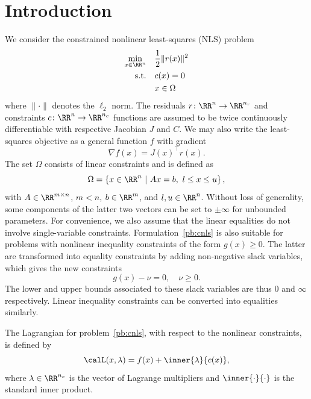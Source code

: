 \section{Introduction}

We consider the constrained nonlinear least-squares (NLS) problem
\begin{equation}
	\label{pb:cnls}
	\begin{aligned}
		\min_{x\in \RR^n} \quad & \dfrac{1}{2} \|r(x)\|^2 \\
		\text{s.t.} \quad & c(x) = 0 \\
		& x \in \Omega
	\end{aligned}
\end{equation}
where $\|\cdot\|$ denotes the $\ell_2$ norm. The residuals $r\colon \RR^n \to \RR^{n_r}$ and constraints $c\colon \RR^n \to \RR^{n_c}$ functions are assumed to be twice continuously differentiable with respective Jacobian $J$ and $C$. We may also write the least-squares objective as a general function $f$ with gradient 
\[\nabla f(x) = J(x)^\top r(x).\] 
The set $\Omega$ consists of linear constraints and is defined as
\begin{equation}\label{eq:linear_constraints}
	\Omega = \left\{ x \in \RR^n \ | \ Ax=b,\ l \le x \le u\right\},
\end{equation}
with $A\in\RR^{m\times n}$, $m < n$, $b\in \RR^m$, and $l,u \in \RR^n$. Without loss of generality, some components of the latter two vectors can be set to $\pm \infty$ for unbounded parameters. For convenience, we also assume that the linear equalities do not involve single-variable constraints. Formulation~\eqref{pb:cnls} is also suitable for problems with nonlinear inequality constraints of the form $g(x) \ge 0$. The latter are transformed into equality constraints by adding non-negative slack variables, which gives the new constraints
\begin{equation*}
	g(x) - \nu = 0,\quad \nu \ge 0.
\end{equation*}
The lower and upper bounds associated to these slack variables are thus $0$ and $\infty$ respectively. Linear inequality constraints can be converted into equalities similarly.

The Lagrangian for problem~\eqref{pb:cnls}, with respect to the nonlinear constraints, is defined by 
\begin{equation*}
	\calL(x,\lambda) = f(x) + \inner{\lambda}{c(x)},
\end{equation*}
where $\lambda \in \RR^{n_c}$ is the vector of Lagrange multipliers and $\inner{\cdot}{\cdot}$ is the standard inner product.

